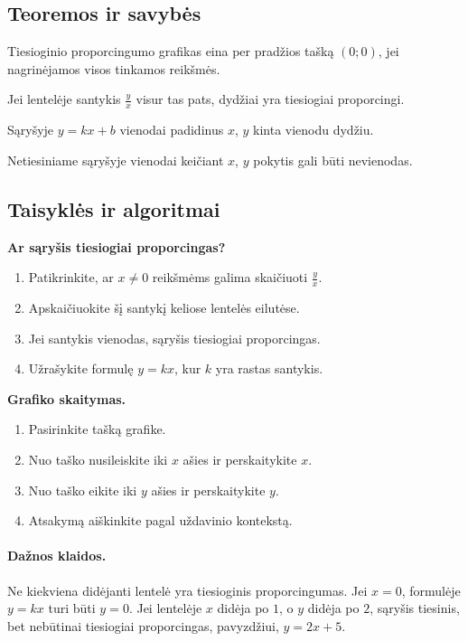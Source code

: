 \subsection{Teoremos ir savybės}
\begin{savybe}
Tiesioginio proporcingumo grafikas eina per pradžios tašką \((0;0)\), jei nagrinėjamos visos tinkamos reikšmės.
\end{savybe}
\begin{savybe}
Jei lentelėje santykis \(\frac{y}{x}\) visur tas pats, dydžiai yra tiesiogiai proporcingi.
\end{savybe}
\begin{savybe}
Sąryšyje \(y=kx+b\) vienodai padidinus \(x\), \(y\) kinta vienodu dydžiu.
\end{savybe}
\begin{savybe}
Netiesiniame sąryšyje vienodai keičiant \(x\), \(y\) pokytis gali būti nevienodas.
\end{savybe}

\subsection{Taisyklės ir algoritmai}
\textbf{Ar sąryšis tiesiogiai proporcingas?}
\begin{enumerate}[label=\arabic*.]
\item Patikrinkite, ar \(x\ne 0\) reikšmėms galima skaičiuoti \(\frac{y}{x}\).
\item Apskaičiuokite šį santykį keliose lentelės eilutėse.
\item Jei santykis vienodas, sąryšis tiesiogiai proporcingas.
\item Užrašykite formulę \(y=kx\), kur \(k\) yra rastas santykis.
\end{enumerate}

\textbf{Grafiko skaitymas.}
\begin{enumerate}[label=\arabic*.]
\item Pasirinkite tašką grafike.
\item Nuo taško nusileiskite iki \(x\) ašies ir perskaitykite \(x\).
\item Nuo taško eikite iki \(y\) ašies ir perskaitykite \(y\).
\item Atsakymą aiškinkite pagal uždavinio kontekstą.
\end{enumerate}

\paragraph{Dažnos klaidos.}
Ne kiekviena didėjanti lentelė yra tiesioginis proporcingumas. Jei \(x=0\), formulėje \(y=kx\) turi būti \(y=0\). Jei lentelėje \(x\) didėja po \(1\), o \(y\) didėja po \(2\), sąryšis tiesinis, bet nebūtinai tiesiogiai proporcingas, pavyzdžiui, \(y=2x+5\).

